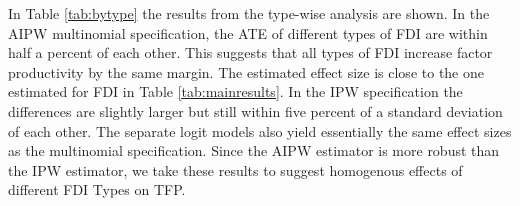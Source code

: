 \documentclass[a4paper,11pt]{scrartcl}
\begin{document}
In Table \ref{tab:bytype} the results from the type-wise analysis are shown. In the AIPW multinomial specification, the ATE of different types of FDI are within half a percent of each other. This suggests that all types of FDI increase factor productivity by the same margin. The estimated effect size is close to the one estimated for FDI in Table \ref{tab:mainresults}. In the IPW specification the differences are slightly larger but still within five percent of a standard deviation of each other.  The separate logit models also yield essentially the same effect sizes as the multinomial specification. Since the AIPW estimator is more robust than the IPW estimator, we take these results to suggest homogenous effects of different FDI Types on TFP.

\newpage

\end{document}
